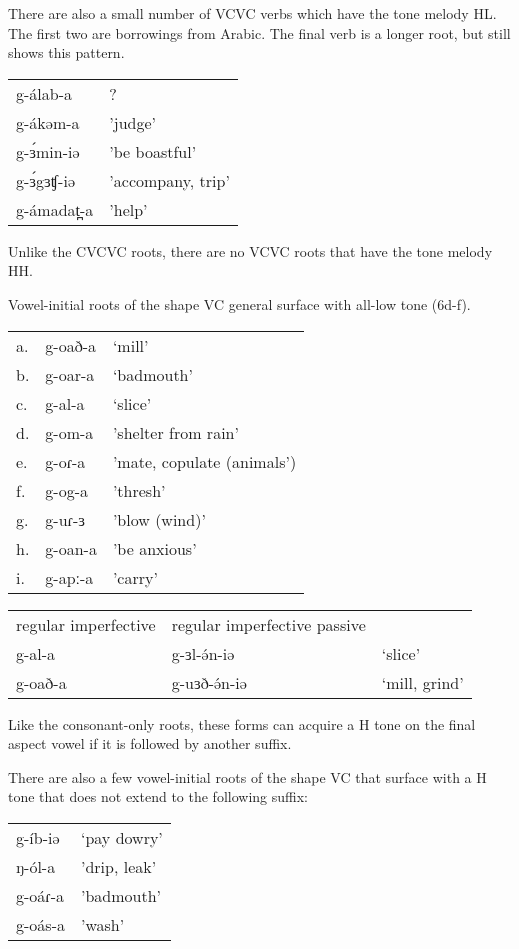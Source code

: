 There are also a small number of VCVC verbs which have the tone melody HL. The first two are borrowings from Arabic. The final verb is a longer root, but still shows this pattern. 

\ea 
\begin{tabular}[t]{ll}
g-álab-a	&	? \\%
g-ákəm-a	&	'judge'\\
g-ɜ́min-iə	&	'be boastful'\\
g-ɜ́gɜʧ-iə	&	'accompany, trip'\\
g-ámadat̪-a	&	'help'\\	
\end{tabular}
\z 

Unlike the CVCVC roots, there are no VCVC roots that have the tone melody HH.

Vowel-initial roots of the shape VC general surface with all-low tone (6d-f). 

\ea 
\begin{tabular}[t]{lll}
a.	&	g-oað-a	&	‘mill’\\
b.	&	g-oar-a	&	‘badmouth’\\
c.	&	g-al-a	&	‘slice’\\
d.	&	g-om-a	&	'shelter from rain'\\
e.	&	g-oɾ-a	&	'mate, copulate (animals')\\
f.	&	g-og-a	&	'thresh'\\
g.	&	g-uɾ-ɜ	&	'blow (wind)'\\
h.	&	g-oan-a	&	'be anxious'\\
i.	&	g-apː-a	&	'carry'\\	
\end{tabular}
\z 


\ea 
\begin{tabular}[t]{lll}
regular imperfective	&	regular imperfective passive	\\
g-al-a 	&	g-ɜl-ə́n-iə	&	‘slice’\\
g-oað-a	&	g-uɜð-ə́n-iə	&	‘mill, grind’\\	
\end{tabular}
\z 

Like the consonant-only roots, these forms can acquire a H tone on the final aspect vowel if it is followed by another suffix.

There are also a few vowel-initial roots of the shape VC that surface with a H tone that does not extend to the following suffix:

\ea 
\begin{tabular}[t]{ll}
g-íb-iə	&	‘pay dowry'\\
ŋ-ól-a	&	'drip, leak'\\
g-oáɾ-a	&	'badmouth'\\
g-oás-a	&	'wash'\\	
\end{tabular}
\z 

